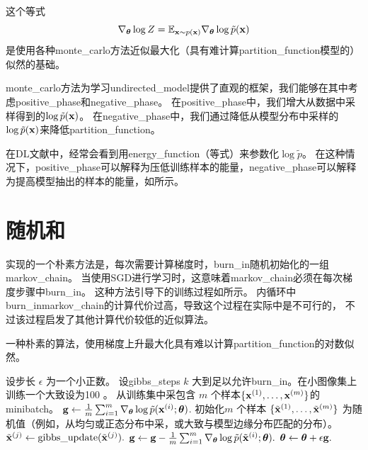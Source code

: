 这个等式
\begin{equation}
\label{eq:18.15}
	\nabla_{\boldsymbol{\theta}} \log Z = \mathbb{E}_{\mathbf{x} \sim p(\mathbf{x})} \nabla_{\boldsymbol{\theta}} \log \tilde{p}(\mathbf{x})
\end{equation}
是使用各种\gls{monte_carlo}方法近似最大化（具有难计算\gls{partition_function}模型的）似然的基础。

\gls{monte_carlo}方法为学习\gls{undirected_model}提供了直观的框架，我们能够在其中考虑\gls{positive_phase}和\gls{negative_phase}。
在\gls{positive_phase}中，我们增大从数据中采样得到的$\log \tilde{p}(\mathbf{x})$。
在\gls{negative_phase}中，我们通过降低从模型分布中采样的$\log \tilde{p}(\mathbf{x})$来降低\gls{partition_function}。

在\gls{DL}文献中，经常会看到用\gls{energy_function}（等式）来参数化$\log \tilde{p}$。
在这种情况下，\gls{positive_phase}可以解释为压低训练样本的能量，\gls{negative_phase}可以解释为提高模型抽出的样本的能量，如所示。

\section{随机和}
\label{sec:stochastic_maximum_likelihood_and_contrastive_divergence}
实现的一个朴素方法是，每次需要计算梯度时，\gls{burn_in}随机初始化的一组\gls{markov_chain}。
当使用\gls{SGD}进行学习时，这意味着\gls{markov_chain}必须在每次梯度步骤中\gls{burn_in}。
这种方法引导下的训练过程如所示。
内循环中\gls{burn_in}\gls{markov_chain}的计算代价过高，导致这个过程在实际中是不可行的，
不过该过程启发了其他计算代价较低的近似算法。

\begin{algorithm}[ht]
\caption{一种朴素的算法，使用梯度上升最大化具有难以计算\gls{partition_function}的对数似然。}
\label{alg:naive_cd}
\begin{algorithmic}
\STATE 设步长 $\epsilon$ 为一个小正数。
\STATE 设\gls{gibbs_steps} $k$ 大到足以允许\gls{burn_in}。在小图像集上训练一个大致设为100 。
\STATE 从训练集中采包含 $m$ 个样本$\{ \mathbf{x}^{(1)}, \dots, \mathbf{x}^{(m)}\}$的\gls{minibatch}。
\STATE $\mathbf{g} \leftarrow \frac{1}{m} \sum_{i=1}^m \nabla_{\boldsymbol{\theta}} \log \tilde{p}(\mathbf{x}^{(i)}; \boldsymbol{\theta})$.
\STATE 初始化$m$ 个样本 $\{ \tilde{\mathbf{x}}^{(1)}, \dots, \tilde{\mathbf{x}}^{(m)} \}$ 为随机值（例如，从均匀或正态分布中采，或大致与模型边缘分布匹配的分布）。
        \STATE $\tilde{\mathbf{x}}^{(j)} \leftarrow \text{gibbs\_update}(\tilde{\mathbf{x}}^{(j)}).$
    \ENDFOR
\ENDFOR
\STATE $\mathbf{g} \leftarrow \mathbf{g} - \frac{1}{m} \sum_{i=1}^m \nabla_{\boldsymbol{\theta}} \log \tilde{p}( \tilde{\mathbf{x}}^{(i)} ; \boldsymbol{\theta} ).$
\STATE $\boldsymbol{\theta} \leftarrow \boldsymbol{\theta} + \epsilon \mathbf{g}.$
\ENDWHILE
\end{algorithmic}
\end{algorithm}


